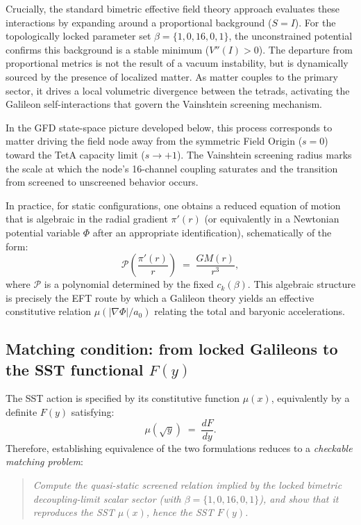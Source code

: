 \documentclass[twocolumn]{iopjournal}
\begin{document}
Crucially, the standard bimetric effective field theory approach evaluates these interactions by expanding around a proportional background ($S = I$). For the topologically locked parameter set $\beta=\{1,0,16,0,1\}$, the unconstrained potential confirms this background is a stable minimum ($V''(I) > 0$). The departure from proportional metrics is not the result of a vacuum instability, but is dynamically sourced by the presence of localized matter. As matter couples to the primary sector, it drives a local volumetric divergence between the tetrads, activating the Galileon self-interactions that govern the Vainshtein screening mechanism.

In the GFD state-space picture developed below, this process corresponds to matter driving the field node away from the symmetric Field Origin ($s = 0$) toward the TetA capacity limit ($s \to +1$). The Vainshtein screening radius marks the scale at which the node's 16-channel coupling saturates and the transition from screened to unscreened behavior occurs.

In practice, for static configurations, one obtains a reduced equation of motion that is algebraic in the radial gradient $\pi'(r)$ (or equivalently in a Newtonian potential variable $\Phi$ after an appropriate identification), schematically of the form:
\begin{equation}
\mathcal{P}\!\left(\frac{\pi'(r)}{r}\right) \;=\; \frac{G M(r)}{r^3},
\end{equation}
where $\mathcal{P}$ is a polynomial determined by the fixed $c_k(\beta)$. This algebraic structure is precisely the EFT route by which a Galileon theory yields an effective constitutive relation $\mu(|\nabla\Phi|/a_0)$ relating the total and baryonic accelerations.

\subsection*{Matching condition: from locked Galileons to the SST functional $F(y)$}
The SST action is specified by its constitutive function $\mu(x)$, equivalently by a definite $F(y)$ satisfying:
\begin{equation}
\mu(\sqrt{y}) \;=\; \frac{dF}{dy}.
\end{equation}
Therefore, establishing equivalence of the two formulations reduces to a \emph{checkable matching problem}:

\begin{quote}
\emph{Compute the quasi-static screened relation implied by the locked bimetric decoupling-limit scalar sector (with $\beta=\{1,0,16,0,1\}$), and show that it reproduces the SST $\mu(x)$, hence the SST $F(y)$.}
\end{quote}
\end{document}

